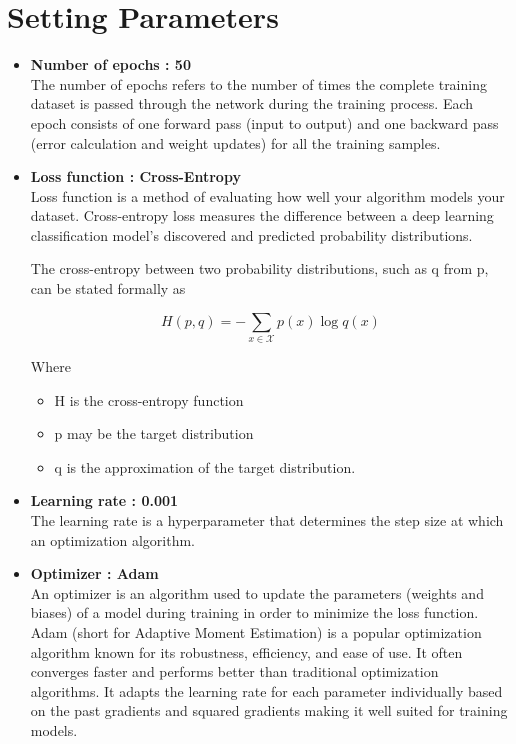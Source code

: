 	\section{Setting Parameters}
	\begin{itemize}
		\item \textbf{Number of epochs : 50} \\
			The number of epochs refers to the number of times the complete training dataset is passed through the network during the training process. Each epoch consists of one forward pass (input to output) and one backward pass (error calculation and weight updates) for all the training samples.
		\item \textbf{Loss function : Cross-Entropy}\cite{mao2023crossentropy} \\
			Loss function is a method of evaluating how well your algorithm models your dataset. Cross-entropy loss measures the difference between a deep learning classification model's discovered and predicted probability distributions.

			The cross-entropy between two probability distributions, such as q from p, can be stated formally as
			
			\begin{equation}
				H(p, q) = -\sum_{x \in \mathcal{X}} p(x) \log q(x)
			\end{equation}

			Where
			\begin{itemize}
				\item H is the cross-entropy function
				\item p may be the target distribution
				\item q is the approximation of the target distribution.
			\end{itemize} 

		\item \textbf{Learning rate : 0.001} \\
			The learning rate is a hyperparameter that determines the step size at which an optimization algorithm.
		\item \textbf{Optimizer : Adam} \cite{kingma2017adam}\\
			An optimizer  is an algorithm used to update the parameters (weights and biases) of a model during training in order to minimize the loss function. 
			Adam (short for Adaptive Moment Estimation) is a popular optimization algorithm known for its robustness, efficiency, and ease of use. It often converges faster and performs better than traditional optimization algorithms.
			It adapts the learning rate for each parameter individually based on the past gradients and squared gradients making it well suited for training models.
	\end{itemize}

